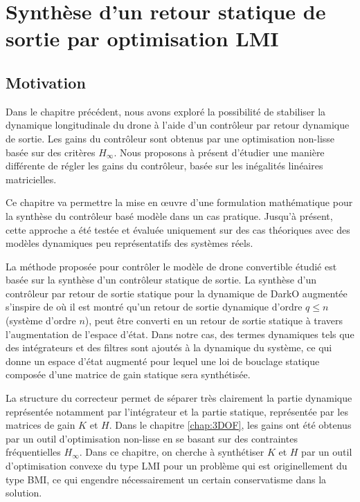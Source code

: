 \chapter{Synthèse d'un retour statique de sortie par optimisation LMI}
\minitoc
\label{chap:LMI}

\section{Motivation}
\label{sec:motivationLMI}

Dans le chapitre précédent, nous avons exploré la possibilité de stabiliser la dynamique longitudinale du drone à l'aide d'un contrôleur par retour dynamique de sortie. Les gains du contrôleur sont obtenus par une optimisation non-lisse basée sur des critères $H_{\infty}$. Nous proposons à présent d'étudier une manière différente de régler les gains du contrôleur, basée sur les inégalités linéaires matricielles.

Ce chapitre va permettre la mise en œuvre d'une formulation mathématique pour la synthèse du contrôleur basé modèle dans un cas pratique. Jusqu'à présent, cette approche a été testée et évaluée uniquement sur des cas théoriques \cite{Arzelier2018} avec des modèles dynamiques peu représentatifs des systèmes réels. 

La méthode proposée pour contrôler le modèle de drone convertible étudié est basée sur la synthèse d'un contrôleur statique de sortie. La synthèse d'un contrôleur par retour de sortie statique pour la dynamique de DarkO augmentée s'inspire de \cite{SYRMOS1997125} où il est montré qu'un retour de sortie dynamique d'ordre $q \leq n$ (système d'ordre $n$), peut être converti en un retour de sortie statique à travers l'augmentation de l'espace d'état. Dans notre cas, des termes dynamiques tels que des intégrateurs et des filtres sont ajoutés à la dynamique du système, ce qui donne un espace d'état augmenté pour lequel une loi de bouclage statique composée d'une matrice de gain statique sera synthétisée.

La structure du correcteur permet de séparer  très clairement la partie dynamique représentée notamment par l'intégrateur et la partie statique, représentée par les matrices de gain $K$ et $H$. Dans le chapitre \ref{chap:3DOF}, les gains ont été obtenus par un outil d'optimisation non-lisse en se basant sur des contraintes fréquentielles $H_{\infty}$. Dans ce chapitre, on cherche à synthétiser $K$ et $H$ par un outil d'optimisation convexe du type LMI pour un problème qui est originellement du type BMI, ce qui engendre nécessairement un certain conservatisme dans la solution.

